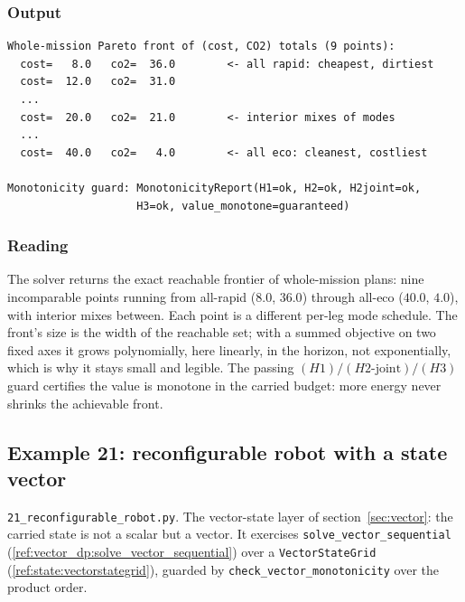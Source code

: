 \documentclass[11pt,a4paper]{article}
\begin{document}
\subsubsection*{Output}
\begin{lstlisting}[language={},numbers=none,keywordstyle={}]
Whole-mission Pareto front of (cost, CO2) totals (9 points):
  cost=   8.0   co2=  36.0        <- all rapid: cheapest, dirtiest
  cost=  12.0   co2=  31.0
  ...
  cost=  20.0   co2=  21.0        <- interior mixes of modes
  ...
  cost=  40.0   co2=   4.0        <- all eco: cleanest, costliest

Monotonicity guard: MonotonicityReport(H1=ok, H2=ok, H2joint=ok,
                    H3=ok, value_monotone=guaranteed)
\end{lstlisting}

\subsubsection*{Reading}
The solver returns the exact reachable frontier of whole-mission plans:
nine incomparable points running from all-rapid ($8.0$, $36.0$) through
all-eco ($40.0$, $4.0$), with interior mixes between. Each point is a
different per-leg mode schedule. The front's size is the width of the
reachable set; with a summed objective on two fixed axes it grows
polynomially, here linearly, in the horizon, not exponentially, which is
why it stays small and legible. The passing $(H1)/(H2\text{-joint})/(H3)$
guard certifies the value is monotone in the carried budget: more energy
never shrinks the achievable front.

\subsection{Example 21: reconfigurable robot with a state vector}
\label{ex:21}

\texttt{21\_reconfigurable\_robot.py}. The vector-state layer of
section~\ref{sec:vector}: the carried state is not a scalar but a vector.
It exercises \texttt{solve\_vector\_sequential}
(\ref{ref:vector_dp:solve_vector_sequential}) over a
\texttt{VectorStateGrid} (\ref{ref:state:vectorstategrid}), guarded by
\texttt{check\_vector\_monotonicity} over the product order.
\end{document}
